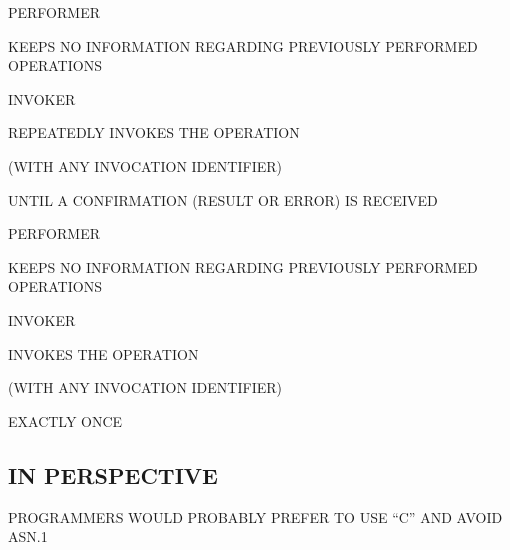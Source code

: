 \begin{bwslide}

\begin{nrtc}
\item	PERFORMER
    \begin{nrtc}
    \item	KEEPS NO INFORMATION REGARDING PREVIOUSLY PERFORMED OPERATIONS
    \end{nrtc}

\item	INVOKER
    \begin{nrtc}
    \item	REPEATEDLY INVOKES THE OPERATION
	\begin{nrtc}
	\item	(WITH ANY INVOCATION IDENTIFIER)
	\end{nrtc}
		UNTIL A CONFIRMATION (RESULT OR ERROR) IS RECEIVED
    \end{nrtc}
\end{nrtc}
\end{bwslide}


\begin{bwslide}

\begin{nrtc}
\item	PERFORMER
    \begin{nrtc}
    \item	KEEPS NO INFORMATION REGARDING PREVIOUSLY PERFORMED OPERATIONS
    \end{nrtc}

\item	INVOKER
    \begin{nrtc}
    \item	INVOKES THE OPERATION
	\begin{nrtc}
	\item	(WITH ANY INVOCATION IDENTIFIER)
	\end{nrtc}
		EXACTLY ONCE
    \end{nrtc}
\end{nrtc}
\end{bwslide}


\begin{bwslide}
\part*	{IN PERSPECTIVE}\bf

\begin{nrtc}
\item	PROGRAMMERS WOULD PROBABLY PREFER TO USE ``C'' AND AVOID ASN.1
\end{nrtc}
\end{bwslide}


